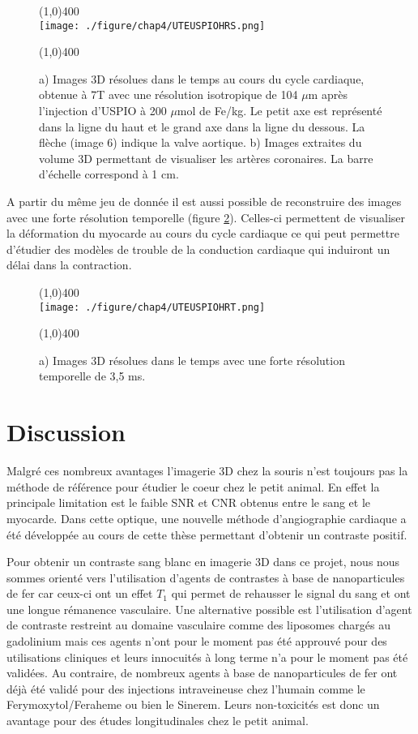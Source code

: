 \begin{figure}[H]
\centering
\line(1,0){400} \\
\texttt{[image: ./figure/chap4/UTEUSPIOHRS.png]}
\caption[Image HRS]{\label{fig:UTEUSPIOHRS} a) Images 3D résolues dans le temps au cours du cycle cardiaque, obtenue à 7T avec une résolution isotropique de 104 $\mu$m après l'injection d'USPIO à 200 $\mu$mol de Fe/kg. Le petit axe est représenté dans la ligne du haut et le grand axe dans la ligne du dessous. La flèche (image 6) indique la valve aortique. b) Images extraites du volume 3D permettant de visualiser les artères coronaires. La barre d'échelle correspond à 1 cm.}
\line(1,0){400} \\ 
\end{figure}

A partir du même jeu de donnée il est aussi possible de reconstruire des images avec une forte résolution temporelle (figure \ref{fig:UTEUSPIOHRT}). Celles-ci permettent de visualiser la déformation du myocarde au cours du cycle cardiaque ce qui peut permettre d'étudier des modèles de trouble de la conduction cardiaque qui induiront un délai dans la contraction.

\begin{figure}[H]
\centering
\line(1,0){400} \\
\texttt{[image: ./figure/chap4/UTEUSPIOHRT.png]}
\caption[Image HRT]{\label{fig:UTEUSPIOHRT} a) Images 3D résolues dans le temps avec une forte résolution temporelle de 3,5 ms.}
\line(1,0){400} \\ 
\end{figure}

\section{Discussion}


Malgré ces nombreux avantages l'imagerie 3D chez la souris n'est toujours pas la méthode de référence pour étudier le coeur chez le petit animal. En effet la principale limitation est le faible SNR et CNR obtenus entre le sang et le myocarde. Dans cette optique, une nouvelle méthode d'angiographie cardiaque a été développée au cours de cette thèse permettant d'obtenir un contraste positif. 

Pour obtenir un contraste sang blanc en imagerie 3D dans ce projet, nous nous sommes orienté vers l'utilisation d'agents de contrastes à base de nanoparticules de fer car ceux-ci ont un effet $T_1$ qui permet de rehausser le signal du sang et ont une longue rémanence vasculaire. Une alternative possible est l'utilisation d'agent de contraste restreint au domaine vasculaire comme des liposomes chargés au gadolinium \cite{Ersoy:2004aa} mais ces agents n'ont pour le moment pas été approuvé pour des utilisations cliniques et leurs innocuités à long terme n'a pour le moment pas été validées. Au contraire, de nombreux agents à base de nanoparticules de fer ont déjà été validé pour des injections intraveineuse chez l'humain comme le Ferymoxytol/Feraheme ou bien le Sinerem. Leurs non-toxicités est donc un avantage pour des études longitudinales chez le petit animal.

